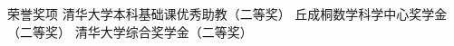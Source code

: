 \begin{rubric}{荣誉奖项}
    \entry*[2024] 清华大学本科基础课优秀助教（二等奖）
    \entry*[2023] 丘成桐数学科学中心奖学金（二等奖）
    \entry*[2023] 清华大学综合奖学金（二等奖）
\end{rubric}